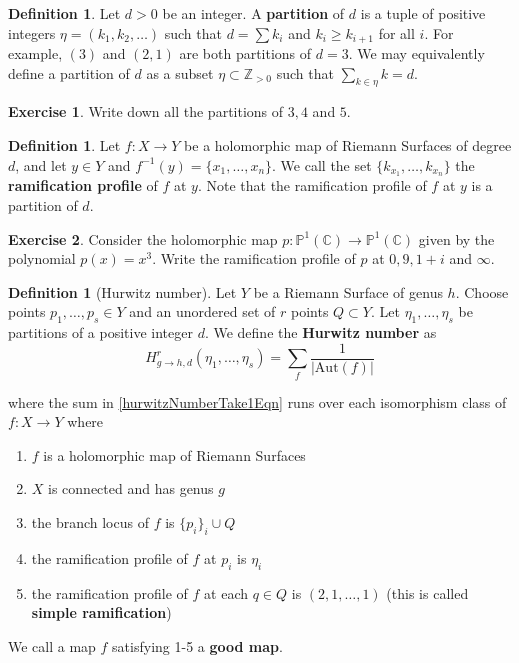 \documentclass[12pt]{book}%
\theoremstyle{plain}
\theoremstyle{definition}
\newtheorem{definition}[theorem]{Definition}
\newtheorem{exercise}{Exercise}
\theoremstyle{remark}
\def\to{\rightarrow}
\def\bZ{{\mathbb{Z}}}
\newcommand{\PoneC}{{\mathbb P}^1({\mathbb C})}
\begin{document}
\begin{definition}
Let $d>0$ be an integer. A \textbf{partition} of $d$ is a tuple of positive integers $\eta = (k_1, k_2, \ldots)$ such that $d = \sum k_i$ and $k_i \geq k_{i+1}$ for all $i$. For example, $(3)$ and $(2,1)$ are both partitions of $d=3$. We may equivalently define a partition of $d$ as a subset $\eta \subset \bZ_{>0}$ such that $\sum_{k\in \eta} k = d$.
\end{definition}

\begin{exercise}
Write down all the partitions of $3, 4$ and $5$.
\end{exercise}

\begin{definition}
Let $f:X \to Y$ be a holomorphic map of Riemann Surfaces of degree $d$, and let $y \in Y$ and $f^{-1}(y) = \{x_1,\ldots,  x_n\}$. We call the set $\{k_{x_1},\ldots, k_{x_n}\}$ the \textbf{ramification profile} of $f$ at $y$. Note that the ramification profile of $f$ at $y$ is a partition of $d$.
\end{definition}

\begin{exercise}
Consider the holomorphic map $p:\PoneC \to \PoneC$ given by the polynomial $p(x) = x^3$. Write the ramification profile of $p$ at $0, 9, 1+i$ and $\infty$.
\end{exercise}

\begin{definition}[Hurwitz number]
\label{hurwitzNumberTake1}
Let $Y$ be a Riemann Surface of genus $h$. Choose points $p_1, \ldots, p_s \in Y$ and an unordered set of $r$ points $Q \subset Y$. Let $\eta_1,\ldots,\eta_s$ be partitions of a positive integer $d$. We define the \textbf{Hurwitz number} as
\begin{equation}
\label{hurwitzNumberTake1Eqn}
H^r_{g\to h, d}(\eta_1,\ldots,\eta_s) = \sum_f \frac{1}{|\text{Aut}(f)|}
\end{equation}

\noindent where the sum in \ref{hurwitzNumberTake1Eqn} runs over each isomorphism class of $f:X \to Y$ where
\begin{enumerate}
\item $f$ is a holomorphic map of Riemann Surfaces
\item $X$ is connected and has genus $g$
\item the branch locus of $f$ is $\{p_i\}_i \cup Q$
\item the ramification profile of $f$ at $p_i$ is $\eta_i$
\item the ramification profile of $f$ at each $q \in Q$ is $(2,1,\ldots,1)$ (this is called \textbf{simple ramification})
\end{enumerate}
\noindent We call a map $f$ satisfying 1-5 a \textbf{good map}.
\end{definition}
\end{document}
